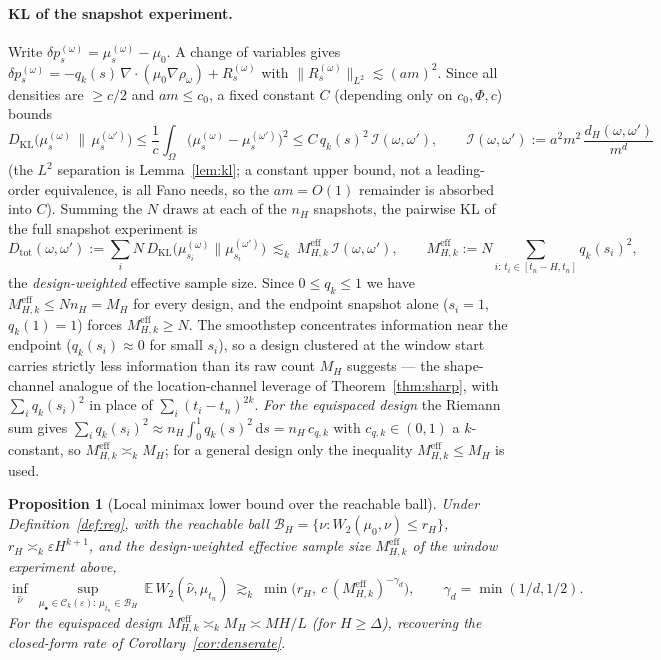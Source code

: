\documentclass[11pt]{article}
\newtheorem{proposition}{Proposition}
\theoremstyle{definition}
\theoremstyle{remark}
\newcommand{\E}{\mathbb{E}}
\newcommand{\Ck}{\mathcal{C}_k(\varepsilon)}
\begin{document}
\paragraph{KL of the snapshot experiment.} Write $\delta p_s^{(\omega)}=\mu_s^{(\omega)}-\mu_0$. A
change of variables gives $\delta p_s^{(\omega)}=-q_k(s)\,\nabla\!\cdot(\mu_0\nabla\rho_\omega)+R_s^{(\omega)}$
with $\|R_s^{(\omega)}\|_{L^2}\lesssim (am)^2$. Since all densities are $\ge c/2$ and $am\le c_0$, a
fixed constant $C$ (depending only on $c_0,\Phi,c$) bounds
\[
  D_{\mathrm{KL}}\big(\mu_s^{(\omega)}\,\big\|\,\mu_s^{(\omega')}\big)
  \le \frac{1}{c}\int_\Omega\big(\mu_s^{(\omega)}-\mu_s^{(\omega')}\big)^2
  \le C\,q_k(s)^2\,\mathcal I(\omega,\omega'),\qquad
  \mathcal I(\omega,\omega'):=a^2 m^2\,\frac{d_H(\omega,\omega')}{m^d}
\]
(the $L^2$ separation is Lemma~\ref{lem:kl}; a constant upper bound, not a leading-order equivalence,
is all Fano needs, so the $am=O(1)$ remainder is absorbed into $C$). Summing the $N$ draws at each of
the $n_H$ snapshots, the pairwise KL of the full snapshot experiment is
\[
  D_{\mathrm{tot}}(\omega,\omega'):=\sum_i N\,D_{\mathrm{KL}}\big(\mu_{s_i}^{(\omega)}\|\mu_{s_i}^{(\omega')}\big)
  \ \lesssim_k\ M^{\mathrm{eff}}_{H,k}\,\mathcal I(\omega,\omega'),
  \qquad
  M^{\mathrm{eff}}_{H,k}:=N\!\!\sum_{i:\,t_i\in[t_n-H,t_n]}\!\! q_k(s_i)^2,
\]
the \emph{design-weighted} effective sample size. Since $0\le q_k\le1$ we have
$M^{\mathrm{eff}}_{H,k}\le Nn_H=M_H$ for every design, and the endpoint snapshot alone ($s_i=1$,
$q_k(1)=1$) forces $M^{\mathrm{eff}}_{H,k}\ge N$. The smoothstep concentrates information near the
endpoint ($q_k(s_i)\approx0$ for small $s_i$), so a design clustered at the window start carries
strictly less information than its raw count $M_H$ suggests --- the shape-channel analogue of the
location-channel leverage of Theorem~\ref{thm:sharp}, with $\sum_i q_k(s_i)^2$ in place of
$\sum_i(t_i-t_n)^{2k}$. \emph{For the equispaced design} the Riemann sum gives
$\sum_i q_k(s_i)^2\approx n_H\!\int_0^1 q_k(s)^2\,\mathrm ds=n_H\,c_{q,k}$ with $c_{q,k}\in(0,1)$ a
$k$-constant, so $M^{\mathrm{eff}}_{H,k}\asymp_k M_H$; for a general design only the inequality
$M^{\mathrm{eff}}_{H,k}\le M_H$ is used.

\begin{proposition}[Local minimax lower bound over the reachable ball]\label{prop:reduction}
Under Definition~\ref{def:reg}, with the reachable ball $\mathcal B_H=\{\nu:W_2(\mu_0,\nu)\le r_H\}$,
$r_H\asymp_k\varepsilon H^{k+1}$, and the design-weighted effective sample size $M^{\mathrm{eff}}_{H,k}$
of the window experiment above,
\[
  \inf_{\hat\nu}\ \sup_{\mu_\bullet\in\Ck:\,\mu_{t_n}\in\mathcal B_H}\ \E\,W_2(\hat\nu,\mu_{t_n})
  \ \gtrsim_k\ \min\!\big(r_H,\ c\,(M^{\mathrm{eff}}_{H,k})^{-\gamma_d}\big),
  \qquad\gamma_d=\min(1/d,1/2).
\]
For the equispaced design $M^{\mathrm{eff}}_{H,k}\asymp_k M_H\asymp MH/L$ (for $H\ge\Delta$), recovering
the closed-form rate of Corollary~\ref{cor:denserate}.
\end{proposition}
\end{document}

